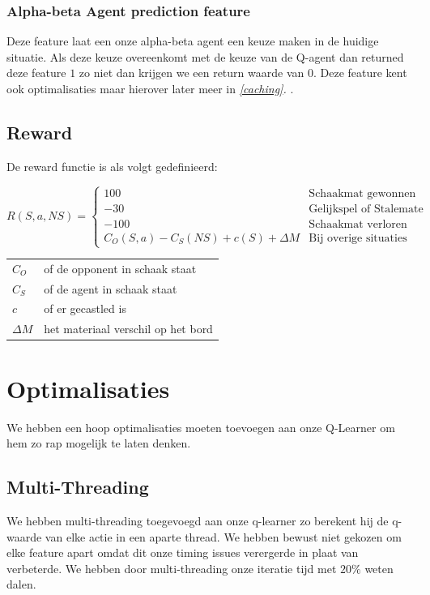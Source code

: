 \documentclass[a4paper,openany]{uantwerpenassignment}
\makeatletter
\newenvironment{conditions}
  {\par\vspace{\abovedisplayskip}\noindent\begin{tabular}{>{$}l<{$} @{${}={}$} l}}
  {\end{tabular}\par\vspace{\belowdisplayskip}}
\newcommand{\reference}[1]{\textit{\ref{#1}. \nameref{#1}}}
\makeatother
\begin{document}
\subsection{Alpha-beta Agent prediction feature}

Deze feature laat een onze alpha-beta agent een keuze maken in de huidige situatie. Als deze keuze overeenkomt met de keuze van de Q-agent dan returned deze feature $1$ zo niet dan krijgen we een return waarde van $0$. Deze feature kent ook optimalisaties maar hierover later meer in \reference{caching}.




\section{Reward}

De reward functie is als volgt gedefinieerd:


$$
R(S, a, NS) = 
\begin{cases}
    100 &\mbox{Schaakmat gewonnen}\\
    -30 &\mbox{Gelijkspel of Stalemate}\\
    -100 &\mbox{Schaakmat verloren}\\
     C_O(S, a) - C_S(NS) + c(S) + \Delta M &\mbox{Bij overige situaties}
\end{cases}
$$

\begin{conditions}
    C_O & of de opponent in schaak staat\\
    C_S & of de agent in schaak staat\\
    c &   of er gecastled is\\
    \Delta M & het materiaal verschil op het bord
\end{conditions}


\chapter{Optimalisaties}

We hebben een hoop optimalisaties moeten toevoegen aan onze Q-Learner om hem zo rap mogelijk te laten denken.

\section{Multi-Threading}

We hebben multi-threading toegevoegd aan onze q-learner zo berekent hij de q-waarde van elke actie in een aparte thread. We hebben bewust niet gekozen om elke feature apart omdat dit onze timing issues verergerde in plaat van verbeterde. We hebben door multi-threading onze iteratie tijd met $20\%$ weten dalen.
\end{document}

